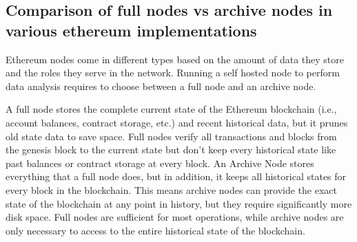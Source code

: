 \documentclass[11pt,a4paper,titlepage]{scrartcl}
\begin{document}
\begin{table}[ht]
\centering
\caption{Main characteristic Infura, Alchemy, and Self-Hosting a Node}
\label{tab:infura_alchemy_self_hosting}
\end{table}


\subsection {Comparison of full nodes vs archive nodes in various ethereum implementations}

Ethereum nodes come in different types based on the amount of data they store and the roles they serve in the network. Running a self hosted node to perform data analysis requires to choose between a full node and an archive node.

A full node stores the complete current state of the Ethereum blockchain (i.e., account balances, contract storage, etc.) and recent historical data, but it prunes old state data to save space. Full nodes verify all transactions and blocks from the genesis block to the current state but don't keep every historical state like past balances or contract storage at every block.
An Archive Node stores everything that a full node does, but in addition, it keeps all historical states for every block in the blockchain. This means archive nodes can provide the exact state of the blockchain at any point in history, but they require significantly more disk space. Full nodes are sufficient for most operations, while archive nodes are only necessary to access to the entire historical state of the blockchain.
\end{document}
